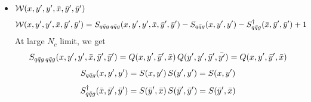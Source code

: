 \documentclass[9pt]{article}
\numberwithin{equation}{section}
\begin{document}
\begin{itemize}
\item $\mathcal{W}(x,y',y',\Bar{x},\Bar{y}',\Bar{y}')$
    \begin{align}
        \mathcal{W}(x,y',y',\Bar{x},\Bar{y}',\Bar{y}') & = S_{q\Bar{q}g\,q\Bar{q}g}(x,y',y',\Bar{x},\Bar{y}',\Bar{y}') -S_{q\Bar{q}g}(x,y',y') - S^{\dagger}_{q\Bar{q}g}(\Bar{x},\Bar{y}',\Bar{y}') + 1
    \end{align}
At large $N_{c}$ limit, we get
$$S_{q\Bar{q}g\,q\Bar{q}g}(x,y',y',\Bar{x},\Bar{y}',\Bar{y}') = Q(x,y',\Bar{y}',\Bar{x})\, Q(y',y',\Bar{y}',\Bar{y'}) = Q(x,y',\Bar{y}',\Bar{x}) $$
$$S_{q\Bar{q}g}(x,y',y') = S(x,y')\, S(y',y') = S(x,y')$$
$$S^{\dagger}_{q\Bar{q}g}(\Bar{x},\Bar{y}',\Bar{y}') = S(\Bar{y}',\Bar{x})\, S(\Bar{y}',\Bar{y}') = S(\Bar{y}',\Bar{x})$$
\end{itemize}
\end{document}
